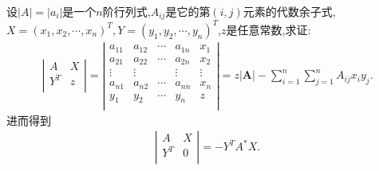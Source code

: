 \documentclass[../../main.tex]{subfiles}
\begin{document}
\begin{proposition}\label{根据行列式代数余子式构造行列式}
设\(\vert A\vert=\vert a_{i}\vert\)是一个\(n\)阶行列式,\(A_{ij}\)是它的第\((i,j)\)元素的代数余子式,$X=(x_1,x_2,\cdots,x_n)^T,Y=(y_1,y_2,\cdots,y_n)^T$,$z$是任意常数,求证:
\begin{gather*}
\left| \begin{matrix}
A&		X\\
Y^T&		z\\
\end{matrix} \right|=\left| \begin{matrix}
a_{11}&		a_{12}&		\cdots&		a_{1n}&		x_1\\
a_{21}&		a_{22}&		\cdots&		a_{2n}&		x_2\\
\vdots&		\vdots&		&		\vdots&		\vdots\\
a_{n1}&		a_{n2}&		\cdots&		a_{nn}&		x_n\\
y_1&		y_2&		\cdots&		y_n&		z\\
\end{matrix} \right|=z|\boldsymbol{A}|-\sum_{i=1}^n{\sum_{j=1}^n{A_{ij}x_iy_j}.}
\end{gather*}
进而得到
\begin{align*}
\left| \begin{matrix}
A&		X\\
Y^T&		0\\
\end{matrix} \right|=-Y^TA^*X.
\end{align*}
\end{proposition}
\end{document}

